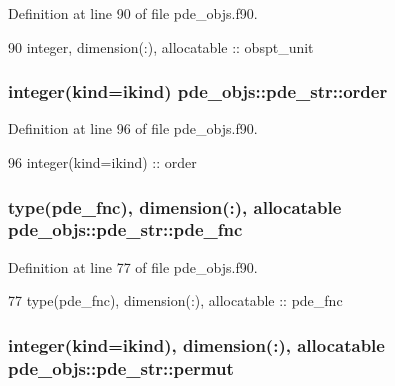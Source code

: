Definition at line 90 of file pde\+\_\+objs.\+f90.


\begin{DoxyCode}
90     \textcolor{keywordtype}{integer}, \textcolor{keywordtype}{dimension(:)}, \textcolor{keywordtype}{allocatable}               :: obspt\_unit
\end{DoxyCode}
\subsubsection[{order}]{\setlength{\rightskip}{0pt plus 5cm}integer(kind=ikind) pde\+\_\+objs\+::pde\+\_\+str\+::order}\label{structpde__objs_1_1pde__str_ad776dfd56961b78bedcc4523543a7031}


Definition at line 96 of file pde\+\_\+objs.\+f90.


\begin{DoxyCode}
96     \textcolor{keywordtype}{integer(kind=ikind)} :: order
\end{DoxyCode}
\subsubsection[{pde\+\_\+fnc}]{\setlength{\rightskip}{0pt plus 5cm}type({\bf pde\+\_\+fnc}), dimension(\+:), allocatable pde\+\_\+objs\+::pde\+\_\+str\+::pde\+\_\+fnc}\label{structpde__objs_1_1pde__str_ab6ea7d9b79bdc40b0a9bb3720fb508a6}


Definition at line 77 of file pde\+\_\+objs.\+f90.


\begin{DoxyCode}
77     \textcolor{keywordtype}{type}(pde_fnc), \textcolor{keywordtype}{dimension(:)}, \textcolor{keywordtype}{allocatable}         :: pde_fnc
\end{DoxyCode}
\subsubsection[{permut}]{\setlength{\rightskip}{0pt plus 5cm}integer(kind=ikind), dimension(\+:), allocatable pde\+\_\+objs\+::pde\+\_\+str\+::permut}\label{structpde__objs_1_1pde__str_af58dd8ac0f7b5c14700068014fbd9b69}


